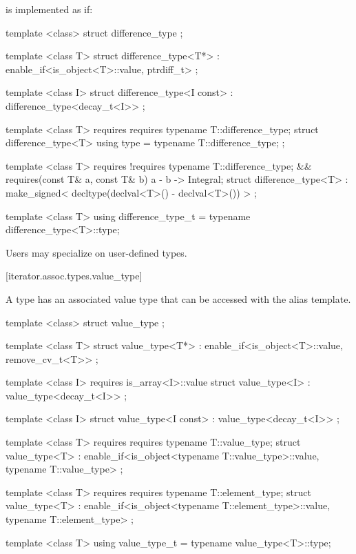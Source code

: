 \pnum
{}%
 is implemented as if:

%
\begin{codeblock}
  template <class> struct difference_type { };

  template <class T>
  struct difference_type<T*>
    : enable_if<is_object<T>::value, ptrdiff_t> { };

  template <class I>
  struct difference_type<I const> : difference_type<decay_t<I>> { };

  template <class T>
    requires requires { typename T::difference_type; }
  struct difference_type<T> {
    using type = typename T::difference_type;
  };

  template <class T>
    requires !requires { typename T::difference_type; } &&
      requires(const T& a, const T& b) { { a - b } -> Integral; }
  struct difference_type<T>
    : make_signed< decltype(declval<T>() - declval<T>()) > {
  };

  template <class T> using difference_type_t
    = typename difference_type<T>::type;
\end{codeblock}

\pnum
Users may specialize  on user-defined types.

[iterator.assoc.types.value_type]{}

\pnum
A  type has an associated value type that can be accessed with the
 alias template.

%
\begin{codeblock}
  template <class> struct value_type { };

  template <class T>
  struct value_type<T*>
    : enable_if<is_object<T>::value, remove_cv_t<T>> { };

  template <class I>
    requires is_array<I>::value
  struct value_type<I> : value_type<decay_t<I>> { };

  template <class I>
  struct value_type<I const> : value_type<decay_t<I>> { };

  template <class T>
    requires requires { typename T::value_type; }
  struct value_type<T>
    : enable_if<is_object<typename T::value_type>::value, typename T::value_type> { };

  template <class T>
    requires requires { typename T::element_type; }
  struct value_type<T>
    : enable_if<is_object<typename T::element_type>::value, typename T::element_type> { };

  template <class T> using value_type_t
    = typename value_type<T>::type;
\end{codeblock}

